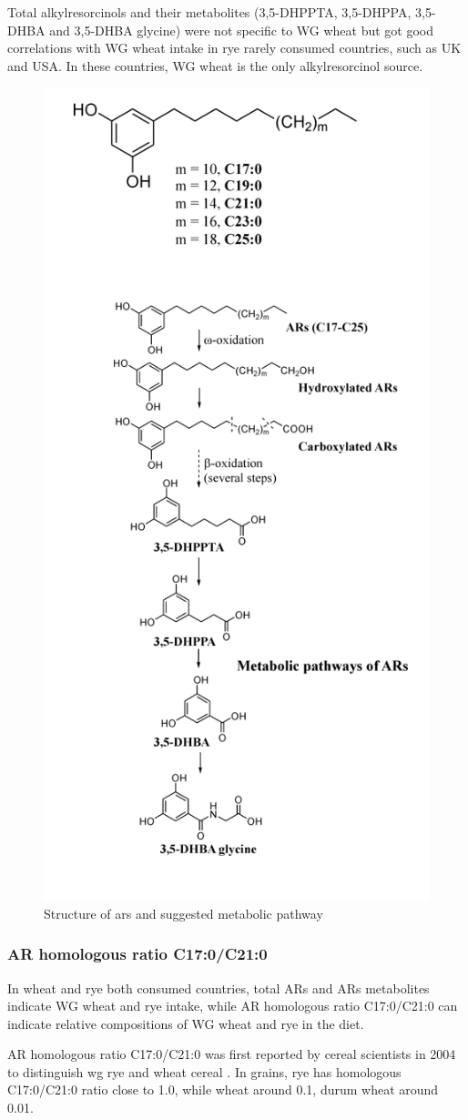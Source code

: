 Total alkylresorcinols and their metabolites (3,5-DHPPTA, 3,5-DHPPA, 3,5-DHBA and 3,5-DHBA glycine) were not specific to WG wheat but got good correlations with WG wheat intake in rye rarely consumed countries, such as UK and USA. In these countries, WG wheat is the only alkylresorcinol source.
\begin{figure}[h!]
	\centering
	\includegraphics[width=0.5\linewidth]{picture/ars_sang_pathway}
	\caption{Structure of \acrshort{ars} and suggested metabolic pathway}
	\label{fig:structure_ars}
\end{figure}

\subsubsection{AR homologous ratio C17:0/C21:0}
In wheat and rye both consumed countries, total ARs and ARs metabolites indicate WG wheat and rye intake, while AR homologous ratio C17:0/C21:0 can indicate relative compositions of WG wheat and rye in the diet.

AR homologous ratio C17:0/C21:0 was first reported by cereal scientists in 2004 to distinguish \acrshort{wg} rye and wheat cereal \cite{Chen2004}. In grains, rye has homologous C17:0/C21:0 ratio close to 1.0, while wheat around 0.1, durum wheat around 0.01.


